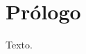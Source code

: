 \documentclass[11pt,twoside]{book}
\begin{document}
\frontmatter
\chapter*{Prólogo}

Texto.
\end{document}
